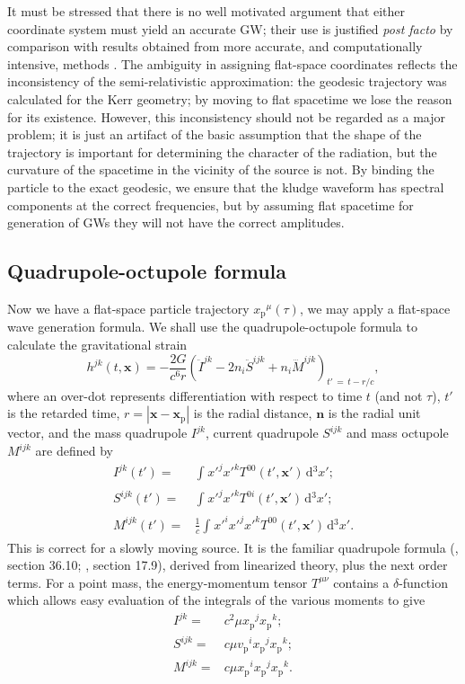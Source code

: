 \documentclass[useAMS,usedcolumn,usegraphicx,usenatbib]{mn2e}
\newcommand{\sub}[1]{\ensuremath{_\mathrm{#1}}}
\newcommand{\dd}{\ensuremath{\mathrm{d}}}
\newcommand{\intd}[4]{\ensuremath{\int_{#1}^{#2}{#3}\,\dd{#4}}}
\newcommand{\recip}[1]{\ensuremath{\frac{1}{#1}}}
\begin{document}
It must be stressed that there is no well motivated argument that either coordinate system must yield an accurate GW; their use is justified {\it post facto} by comparison with results obtained from more accurate, and computationally intensive, methods \citep{Gair2005, Babak2007}. The ambiguity in assigning flat-space coordinates reflects the inconsistency of the semi-relativistic approximation: the geodesic trajectory was calculated for the Kerr geometry; by moving to flat spacetime we lose the reason for its existence. However, this inconsistency should not be regarded as a major problem; it is just an artifact of the basic assumption that the shape of the trajectory is important for determining the character of the radiation, but the curvature of the spacetime in the vicinity of the source is not. By binding the particle to the exact geodesic, we ensure that the kludge waveform has spectral components at the correct frequencies, but by assuming flat spacetime for generation of GWs they will not have the correct amplitudes.

\subsection{Quadrupole-octupole formula}

Now we have a flat-space particle trajectory $x\sub{p}^\mu(\tau)$, we may apply a flat-space wave generation formula. We shall use the quadrupole-octupole formula to calculate the gravitational strain \citep{Bekenstein1973, Press1977, Yunes2008}
\begin{equation}
h^{jk}(t, \boldsymbol{x}) = -\frac{2G}{c^6r}\left(\ddot{I}^{jk} - 2n_i\ddot{S}^{ijk} + n_i\dddot{M}^{ijk}\right)_{t'\, =\, t - r/c},
\label{eq:octupole}
\end{equation}
where an over-dot represents differentiation with respect to time $t$ (and not $\tau$), $t'$ is the retarded time, $r = \left|\boldsymbol{x} - \boldsymbol{x}\sub{p}\right|$ is the radial distance, $\boldsymbol{n}$ is the radial unit vector, and the mass quadrupole ${I}^{jk}$, current quadrupole ${S}^{ijk}$ and mass octupole ${M}^{ijk}$ are defined by
\begin{align}
{I}^{jk}(t') = {} & \intd{}{}{{x'}^j{x'}^kT^{00}(t', \boldsymbol{x'})}{^3x'};\\
{S}^{ijk}(t') = {} & \intd{}{}{{x'}^j{x'}^kT^{0i}(t', \boldsymbol{x'})}{^3x'};\\
{M}^{ijk}(t') = {} & \recip{c}\intd{}{}{{x'}^i{x'}^j{x'}^kT^{00}(t', \boldsymbol{x'})}{^3x'}.
\end{align}
This is correct for a slowly moving source. It is the familiar quadrupole formula (\citealt*{Misner1973}, section 36.10; \citealt{Hobson2006}, section 17.9), derived from linearized theory, plus the next order terms. For a point mass, the energy-momentum tensor $T^{\mu\nu}$ contains a $\delta$-function which allows easy evaluation of the integrals of the various moments to give
\begin{align}
{I}^{jk} = {} & c^2\mu x\sub{p}^jx\sub{p}^k;\\
{S}^{ijk} = {} & c\mu v\sub{p}^ix\sub{p}^jx\sub{p}^k;\\
{M}^{ijk} = {} & c\mu x\sub{p}^ix\sub{p}^jx\sub{p}^k.
\end{align}
\end{document}
